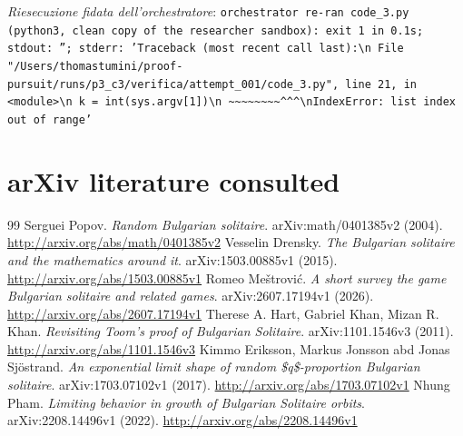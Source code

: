 \documentclass[11pt,a4paper]{article}
\begin{document}
\noindent\emph{Riesecuzione fidata dell'orchestratore}: \texttt{orchestrator re-ran code\_3.py (python3, clean copy of the researcher sandbox): exit 1 in 0.1s; stdout: ''; stderr: 'Traceback (most recent call last):\textbackslash{}n  File "/Users/thomastumini/proof-pursuit/runs/p3\_c3/verifica/attempt\_001/code\_3.py", line 21, in \textless{}module\textgreater{}\textbackslash{}n    k = int(sys.argv[1])\textbackslash{}n            \textasciitilde{}\textasciitilde{}\textasciitilde{}\textasciitilde{}\textasciitilde{}\textasciitilde{}\textasciitilde{}\textasciitilde{}\textasciicircum{}\textasciicircum{}\textasciicircum{}\textbackslash{}nIndexError: list index out of range'}

\section{arXiv literature consulted}
\begin{thebibliography}{99}
 Serguei Popov. \emph{Random Bulgarian solitaire}. arXiv:math/0401385v2 (2004). \url{http://arxiv.org/abs/math/0401385v2}
 Vesselin Drensky. \emph{The Bulgarian solitaire and the mathematics around it}. arXiv:1503.00885v1 (2015). \url{http://arxiv.org/abs/1503.00885v1}
 Romeo Meštrović. \emph{A short survey the game Bulgarian solitaire and related games}. arXiv:2607.17194v1 (2026). \url{http://arxiv.org/abs/2607.17194v1}
 Therese A. Hart, Gabriel Khan, Mizan R. Khan. \emph{Revisiting Toom's proof of Bulgarian Solitaire}. arXiv:1101.1546v3 (2011). \url{http://arxiv.org/abs/1101.1546v3}
 Kimmo Eriksson, Markus Jonsson abd Jonas Sjöstrand. \emph{An exponential limit shape of random \$q\$-proportion Bulgarian solitaire}. arXiv:1703.07102v1 (2017). \url{http://arxiv.org/abs/1703.07102v1}
 Nhung Pham. \emph{Limiting behavior in growth of Bulgarian Solitaire orbits}. arXiv:2208.14496v1 (2022). \url{http://arxiv.org/abs/2208.14496v1}
\end{thebibliography}
\end{document}
